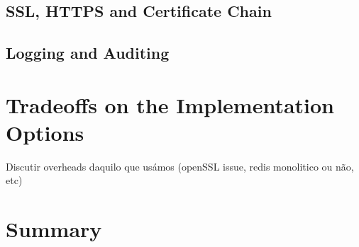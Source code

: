 \subsection{SSL, HTTPS and Certificate Chain}
\label{ssec:ssl_https_certificate_chain}

\subsection{Logging and Auditing} 
\label{sec:logging_and_auditing}

\section{Tradeoffs on the Implementation Options}
\label{sec:tradeoffs_implementation_options}

Discutir overheads daquilo que usámos (openSSL issue, redis monolitico ou não, etc)

\section{Summary}
\label{sec:chapter4_summary}